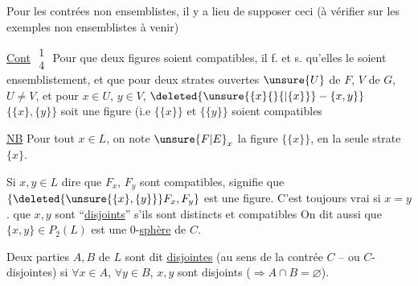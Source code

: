 
Pour les contrées non ensemblistes, il y a lieu de supposer ceci (à vérifier sur les exemples non ensemblistes à venir)

\uline{Cont} $\substack{1\\4}$ Pour que deux figures  soient \margin{\rule{0.35pt}{4.5\baselineskip}}compatibles, il f. et s. qu'elles le soient ensemblistement, et que pour deux  strates ouvertes $\unsure{U}$ de $F$, $V$ de $G$, $U\ne V$,  et pour  $x\in U$, $y\in V$, $\deleted{\unsure{\{x\}\{\}\{|\{x\}\}}-\{x,y\}}$ $\{\{x\},\{y\}\}$ soit une figure (i.e $\{\{x\}\}$ et $\{\{y\}\}$ soient compatibles


\uline{NB} Pour tout $x\in L$, on note $\unsure{F|E}_x$ la figure $\{\{x\}\}$,  en la seule strate $\{x\}$.


 Si $x,y\in L$ dire que $F_x$, $F_y$ sont compatibles, signifie que $\{\deleted{\unsure{\{x\},\{y\}}}F_x,F_y\}$ est  une figure. C'est toujours vrai si $x=y$.   que \deleted{\unsure{$\{$}} $x,y$ sont ``\uline{disjoints}'' s'ils sont distincts et compatibles  On dit aussi  que $\{x,y\}\in P_2(L)$ est une 0-\uline{sphère} de $C$.

Deux parties  $A,B$ de $L$ sont dit \uline{disjointes} (au sens de la contrée $C$ -- ou $C$-disjointes) si $\forall x\in A$, $\forall y\in B$, $x,y$ sont disjoints ($\Longrightarrow A\cap B=\varnothing$).
